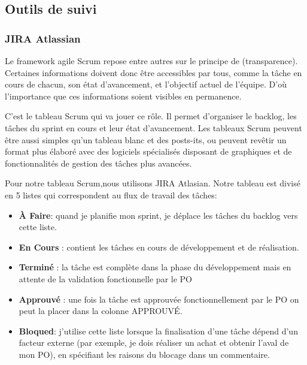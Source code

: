 \subsection{Outils de suivi}

\subsubsection{JIRA Atlassian}

Le framework agile Scrum repose entre autres sur le principe de (transparence). Certaines informations doivent donc \^etre accessibles par tous, comme la t\^ache en cours de chacun, son \'etat d'avancement, et l'objectif actuel de l'\'equipe. D'o\`u l'importance que ces informations soient visibles en permanence.

C'est le tableau Scrum qui va jouer ce r\^ole. Il permet d'organiser le backlog, les t\^aches du sprint en cours et leur \'etat d'avancement. Les tableaux Scrum peuvent \^etre aussi simples qu'un tableau blanc et des posts-its, ou peuvent rev\^etir un format plus \'elabor\'e avec des logiciels sp\'ecialis\'es disposant de graphiques et de fonctionnalit\'es de gestion des t\^aches plus avanc\'ees.

Pour notre tableau Scrum,nous utilisons JIRA Atlasian. Notre tableau est divis\'e en 5 listes qui correspondent au flux de travail des t\^aches:

\begin{itemize}
\item \textbf{\`A Faire}: quand je planifie mon sprint, je d\'eplace les t\^aches du backlog vers cette liste.
\item \textbf{En Cours} : contient les t\^aches en cours de d\'eveloppement et de r\'ealisation.
\item \textbf{Termin\'e} : la t\^ache est compl\`ete dans la phase du d\'eveloppement mais en attente de la validation fonctionnelle par le PO
\item \textbf{Approuv\'e} : une fois la t\^ache est approuv\'ee fonctionnellement par le PO on peut la placer dans la colonne APPROUV\'E.
\item \textbf{Bloqued}: j'utilise cette liste lorsque la finalisation d'une t\^ache d\'epend d'un facteur externe (par exemple, je dois r\'ealiser un achat et obtenir l'aval de mon PO), en sp\'ecifiant les raisons du blocage dans un commentaire.
\end{itemize}

